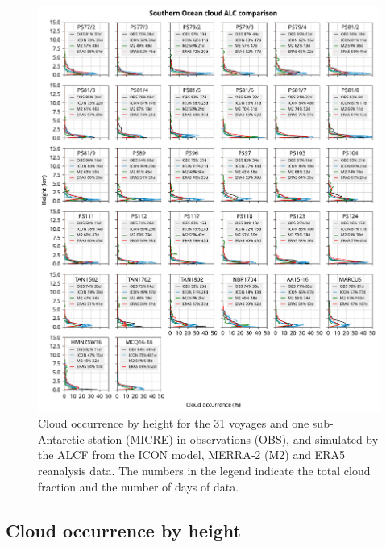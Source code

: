 \documentclass[12pt,a4paper]{article}
\begin{document}
\begin{figure}[p!]
\centerline{
\includegraphics[width=1.06\textwidth]{img/cloud_occurrence_panel.pdf}
}
\caption{Cloud occurrence by height for the 31 voyages and one sub-Antarctic
station (MICRE) in observations (OBS), and simulated by the ALCF from the
ICON model, MERRA‐2 (M2) and ERA5 reanalysis data. The numbers in the legend
indicate the total cloud fraction and the number of days of data.}
\label{fig:cloud-occurrence-panel}
\end{figure}

\subsection{Cloud occurrence by height}
\label{sec:cloud-occurrence}
\end{document}

